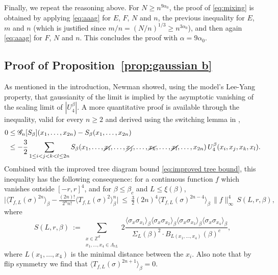 \documentclass[a4paper,oneside,11pt]{article}
\def\Z{\mathbb{Z}}                          %
\newcommand{\be}[1]{\begin{equation}\label{#1}}
\newcommand{\ee}{\end{equation}}
\numberwithin{equation}{section}
\numberwithin{equation}{section}
\numberwithin{equation}{section}
\def\Z{\mathbb{Z}}                          %
\def\be{\begin{equation}}
\def\ee{\end{equation}}
\begin{document}
Finally, we repeat the reasoning above. For $N\ge n^{9\alpha_0}$, the proof of \eqref{eq:mixing} is obtained by applying \eqref{eq:aaag} for $E$, $F$, $N$ and $n$, the previous inequality for $E$, $m$ and $n$ (which is justified since $m/n=(N/n)^{1/3}\ge n^{3\alpha_0}$), and then again \eqref{eq:aaag} for $F$, $N$ and $n$. This concludes the proof with $\alpha=9\alpha_0$.


\subsection{Proof of Proposition~\ref{prop:gaussian b}}\label{sec:4.3}



As mentioned in the introduction, Newman \cite{New75} showed,  using the model's Lee-Yang property,  that gaussianity of the limit is implied by the asymptotic vanishing of the scaling limit of  $|U_4^\beta|$. A more quantitative proof is available  through the  inequality, valid for every $n\ge2$ and derived using the switching lemma in \cite[Proposition 12.1]{Aiz82},
\begin{align} \label{nGaussian}
0 &\leq \mathcal {G}_n[S_\beta] (x_1,\dots,x_{2n}) -S_\beta(x_1,\dots, x_{2n})\nonumber\\    
&\le - \frac{3}{2} \sum_{1\leq i<j<k<l \leq 2n}  S_{\beta}(x_1,\dots,\cancel {x_i},\dots, \cancel {x_j},\dots, \cancel {x_k},\dots, \cancel {x_l},\dots, x_{2n})  
\,U_4^\beta(x_i, x_j, x_k,x_l). 
\end{align}
Combined with the improved tree diagram bound \eqref{eq:improved tree bound}, this inequality has the following consequence: for a continuous function $f$ which vanishes outside $[-r,r]^4$, and for $\beta\le\beta_c$ and $L\le \xi(\beta)$,  
\begin{equation}\label{eq:moment}
\big|\langle T_{f,L}(\sigma)^{2n}\rangle_\beta-\tfrac{(2n)!}{2^nn!}\langle T_{f,L}(\sigma)^2\rangle_\beta^n\big|~\le~ \tfrac32 (2n)^4\langle T_{f,L}(\sigma)^{2n-4}\rangle_\beta \, \|f\|_\infty^4 \,S(L,r,\beta),
\end{equation}
where 
\be\label{eq:bubble log bound}
S(L,r,\beta)~:=\sum_{\substack{x\in\Z^d\\ x_1,\dots,x_4\in\Lambda_{rL}}}2\frac{\langle\sigma_x\sigma_{x_1}\rangle_\beta\langle\sigma_x\sigma_{x_2}\rangle_\beta\langle\sigma_x\sigma_{x_3}\rangle_\beta\langle\sigma_x\sigma_{x_4}\rangle_\beta}{\Sigma_L(\beta)^2\cdot B_{L(x_1,\dots,x_4)}(\beta)^{c}},
\ee
where $L(x_1,\dots,x_4)$ is the minimal distance between the $x_i$. Also note that by flip symmetry we find that $\langle T_{f,L}(\sigma)^{2n+1}\rangle_\beta=0$.
\end{document}
